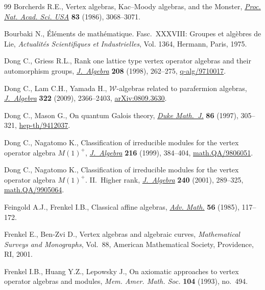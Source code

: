 \documentclass[pdftex]{sigma}
\begin{document}
\begin{thebibliography}{99}
Borcherds R.E., Vertex algebras, {K}ac--{M}oody algebras, and the {M}onster,
  \href{http://dx.doi.org/10.1073/pnas.83.10.3068}{\textit{Proc. Nat. Acad. Sci. USA}} \textbf{83} (1986), 3068--3071.

Bourbaki N., \'El\'ements de math\'ematique. Fasc.~XXXVIII: Groupes et
  alg\`ebres de Lie, \textit{Actualit\'es Scientifiques et Industrielles}, Vol.
  1364, Hermann, Paris, 1975.

Dong C., Griess R.L., Rank one lattice type vertex operator algebras and their
  automorphism groups, \href{http://dx.doi.org/10.1006/jabr.1998.7498}{\textit{J.~Algebra}} \textbf{208} (1998), 262--275,
  \href{http://arxiv.org/abs/q-alg/9710017}{q-alg/9710017}.

Dong C., Lam C.H., Yamada H., {$\mathcal W$}-algebras related to parafermion
  algebras, \href{http://dx.doi.org/10.1016/j.jalgebra.2009.03.034}{\textit{J.~Algebra}} \textbf{322} (2009), 2366--2403,
  \href{http://arxiv.org/abs/0809.3630}{arXiv:0809.3630}.

Dong C., Mason G., On quantum {G}alois theory, \href{http://dx.doi.org/10.1215/S0012-7094-97-08609-9}{\textit{Duke Math.~J.}}
  \textbf{86} (1997), 305--321, \href{http://arxiv.org/abs/hep-th/9412037}{hep-th/9412037}.

Dong C., Nagatomo K., Classif\/ication of irreducible modules for the vertex
  operator algebra {$M(1)^+$}, \href{http://dx.doi.org/10.1006/jabr.1998.7784}{\textit{J.~Algebra}} \textbf{216} (1999),
  384--404, \href{http://arxiv.org/abs/math.QA/9806051}{math.QA/9806051}.

Dong C., Nagatomo K., Classif\/ication of irreducible modules for the vertex
  operator algebra {$M(1)^+$}. {II}.~{H}igher rank, \href{http://dx.doi.org/10.1006/jabr.2000.8716}{\textit{J.~Algebra}}
  \textbf{240} (2001), 289--325, \href{http://arxiv.org/abs/math.QA/9905064}{math.QA/9905064}.

Feingold A.J., Frenkel I.B., Classical af\/f\/ine algebras, \href{http://dx.doi.org/10.1016/0001-8708(85)90027-1}{\textit{Adv. Math.}}
  \textbf{56} (1985), 117--172.

Frenkel E., Ben-Zvi D., Vertex algebras and algebraic curves,
  \textit{Mathematical Surveys and Monographs}, Vol.~88, American Mathematical
  Society, Providence, RI, 2001.

Frenkel I.B., Huang Y.Z., Lepowsky J., On axiomatic approaches to vertex
  operator algebras and modules, \textit{Mem. Amer. Math. Soc.} \textbf{104}
  (1993), no.~494.


\end{thebibliography}
\end{document}
